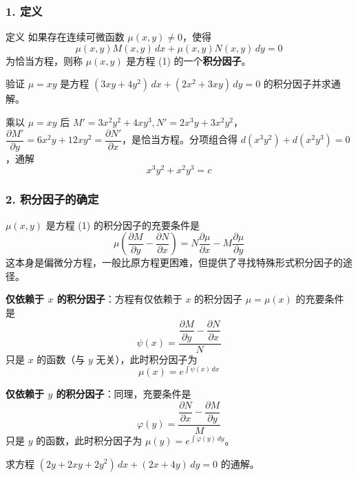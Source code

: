 \subsubsection{1. 定义}

\begin{mydefinition}{定义}
如果存在连续可微函数 $\mu(x,y) \neq 0$，使得
$$\mu(x,y)M(x,y)\,dx + \mu(x,y)N(x,y)\,dy = 0$$
为恰当方程，则称 $\mu(x,y)$ 是方程 (1) 的一个\textbf{积分因子}。
\end{mydefinition}

\begin{example}
验证 $\mu = xy$ 是方程 $(3xy + 4y^2)\,dx + (2x^2 + 3xy)\,dy = 0$ 的积分因子并求通解。
\end{example}

\begin{solution}
乘以 $\mu = xy$ 后 $M' = 3x^2y^2 + 4xy^3, N' = 2x^3y + 3x^2y^2$，$\dfrac{\partial M'}{\partial y} = 6x^2y + 12xy^2 = \dfrac{\partial N'}{\partial x}$，是恰当方程。分项组合得 $d(x^3y^2) + d(x^2y^3) = 0$，通解
$$x^3y^2 + x^2y^3 = c$$
\end{solution}

\subsubsection{2. 积分因子的确定}

$\mu(x,y)$ 是方程 (1) 的积分因子的充要条件是
$$\mu\left(\frac{\partial M}{\partial y} - \frac{\partial N}{\partial x}\right) = N\frac{\partial \mu}{\partial x} - M\frac{\partial \mu}{\partial y}$$
这本身是偏微分方程，一般比原方程更困难，但提供了寻找特殊形式积分因子的途径。

\textbf{仅依赖于 $x$ 的积分因子}：方程有仅依赖于 $x$ 的积分因子 $\mu = \mu(x)$ 的充要条件是
$$\psi(x) = \frac{\dfrac{\partial M}{\partial y} - \dfrac{\partial N}{\partial x}}{N}$$
只是 $x$ 的函数（与 $y$ 无关），此时积分因子为
\begin{equation}\mu(x) = e^{\int \psi(x)\,dx} \tag{10}\end{equation}

\textbf{仅依赖于 $y$ 的积分因子}：同理，充要条件是
$$\varphi(y) = \frac{\dfrac{\partial N}{\partial x} - \dfrac{\partial M}{\partial y}}{M}$$
只是 $y$ 的函数，此时积分因子为 $\mu(y) = e^{\int \varphi(y)\,dy}$。

\begin{example}
求方程 $(2y + 2xy + 2y^2)\,dx + (2x + 4y)\,dy = 0$ 的通解。
\end{example}

